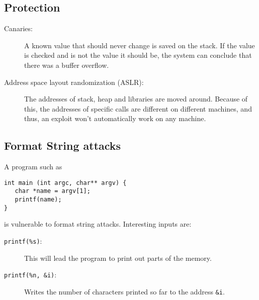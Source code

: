 \subsection{Protection}
\begin{description}
  \item[Canaries:] A known value that should never change is saved on the
    stack. If the value is checked and is not the value it should be, the
    system can conclude that there was a buffer overflow.
  \item [Address space layout randomization (ASLR):] The addresses of
    stack, heap and libraries are moved around. Because of this, the
    addresses of specific calls are different on different machines, and
    thus, an exploit won't automatically work on any machine.
\end{description}

\subsection{Format String attacks}
A program such as
\begin{lstlisting}
int main (int argc, char** argv) {
   char *name = argv[1];
   printf(name);
}
\end{lstlisting}
is vulnerable to format string attacks. Interesting inputs are:
\begin{description}
  \item[\texttt{printf(\%s)}:] This will lead the program to print out parts of
    the memory.
  \item[\texttt{printf(\%n, \&i)}:] Writes the number of characters printed so
    far to the address \texttt{\&i}.
\end{description}

